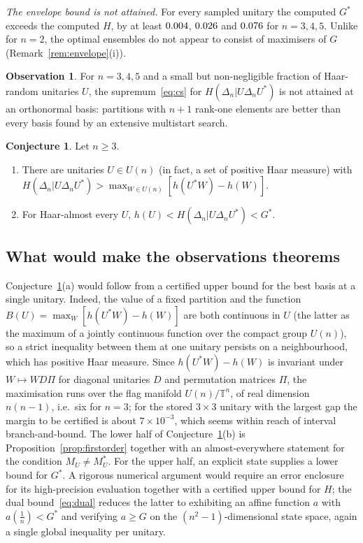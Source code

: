 \documentclass[11pt]{article}
\theoremstyle{plain}
\theoremstyle{definition}
\newtheorem{conjecture}[theorem]{Conjecture}
\newtheorem{observation}[theorem]{Observation}
\theoremstyle{remark}
\begin{document}
\emph{The envelope bound is not attained.} For every sampled unitary the computed $G^*$ exceeds the computed $H$, by at least
$0.004$, $0.026$ and $0.076$ for $n=3,4,5$. Unlike for $n=2$, the optimal ensembles do not
appear to consist of maximisers of $G$ (Remark~\ref{rem:envelope}(i)).

\begin{observation}\label{obs:bases}
For $n=3,4,5$ and a small but non-negligible fraction of Haar-random unitaries $U$, the supremum~\eqref{eq:cs} for
$H(\Delta_n|U\Delta_nU^*)$ is not attained at an orthonormal basis: partitions with $n+1$ rank-one elements are better than
every basis found by an extensive multistart search.
\end{observation}

\begin{conjecture}\label{conj:n3}
Let $n\ge3$.
\begin{enumerate}
\item[(a)] There are unitaries $U\in U(n)$ (in fact, a set of positive Haar measure) with
$H(\Delta_n|U\Delta_nU^*)>\max_{W\in U(n)}[h(U^*W)-h(W)]$.
\item[(b)] For Haar-almost every $U$, $h(U)<H(\Delta_n|U\Delta_nU^*)<G^*$.
\end{enumerate}
\end{conjecture}

\subsection{What would make the observations theorems}\label{sec:status}

Conjecture~\ref{conj:n3}(a) would follow from a certified upper bound for the best basis at a single unitary. Indeed, the
value of a fixed partition and the function $B(U)=\max_W[h(U^*W)-h(W)]$ are both continuous in $U$ (the latter as the
maximum of a jointly continuous function over the compact group $U(n)$), so a strict inequality between them at one unitary
persists on a neighbourhood, which has positive Haar measure. Since $h(U^*W)-h(W)$ is invariant under $W\mapsto WD\Pi$ for
diagonal unitaries $D$ and permutation matrices $\Pi$, the maximisation runs over the flag manifold $U(n)/\mathbb{T}^n$, of real
dimension $n(n-1)$, i.e.\ six for $n=3$; for the stored $3\times3$ unitary with the largest gap the margin to be certified is
about $7\times10^{-3}$, which seems within reach of interval branch-and-bound. The lower half of Conjecture~\ref{conj:n3}(b) is
Proposition~\ref{prop:firstorder} together with an almost-everywhere statement for the condition $M_U\ne M_U^*$. For the upper
half, an explicit state supplies a lower bound for $G^*$. A rigorous numerical argument would require an error
enclosure for its high-precision evaluation together with a certified upper bound for $H$; the dual
bound~\eqref{eq:dual} reduces the latter to exhibiting an affine function $a$ with
$a(\frac1n)<G^*$ and verifying $a\ge G$ on the $(n^2-1)$-dimensional state space, again a single global inequality per
unitary.
\end{document}
